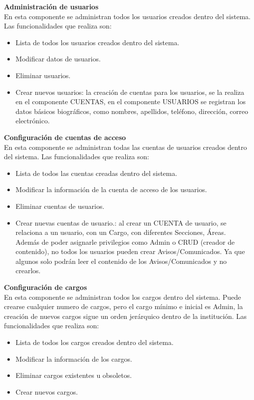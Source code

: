 \documentclass[10pt,letterpaper,twoside]{article}
\newcommand{\ctext}[1]{
    \vspace{5mm}
    {{\textcolor{titlecolor}{\large{\textbf{\textsf{#1}}}}}}
    \\
}
\begin{document}
\begin{multicols}{2}
\ctext{Administración de usuarios}
En esta componente se administran todos los usuarios creados dentro del sistema.
Las funcionalidades que realiza son:
\begin{itemize}
    \item Lista de todos los usuarios creados dentro del sistema.
    \item Modificar datos de usuarios.
    \item Eliminar usuarios.
    \item Crear nuevos usuarios: la creación de cuentas para los usuarios, se la realiza en el componente CUENTAS, en el componente USUARIOS se registran los datos básicos biográficos, como nombres, apellidos, teléfono, dirección, correo electrónico.
\end{itemize}

\ctext{Configuración de cuentas de acceso}
En esta componente se administran todas las cuentas de usuarios creados dentro del sistema.
Las funcionalidades que realiza son:
\begin{itemize}
    \item Lista de todos las cuentas creadas dentro del sistema.
    \item Modificar la información de la cuenta de acceso de los usuarios.
    \item Eliminar cuentas de usuarios.
    \item Crear nuevas cuentas de usuario.: al crear un CUENTA de usuario, se relaciona a un usuario, con un Cargo, con diferentes Secciones, Áreas. Además de poder asignarle privilegios como Admin o CRUD (creador de contenido), no todos los usuarios pueden crear Avisos/Comunicados. Ya que algunos solo podrán leer el contenido de los Avisos/Comunicados y no crearlos.
\end{itemize}

\ctext{Configuración de cargos}
En esta componente se administran todos los cargos dentro del sistema.
Puede crearse cualquier numero de cargos, pero el cargo mínimo e inicial es Admin, la creación de nuevos cargos sigue un orden jerárquico dentro de la institución.
Las funcionalidades que realiza son:
\begin{itemize}
    \item Lista de todos los cargos creados dentro del sistema.
    \item Modificar la información de los cargos.
    \item Eliminar cargos existentes u obsoletos.
    \item Crear nuevos cargos.
\end{itemize}


\end{multicols}
\end{document}
